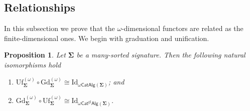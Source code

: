 \documentclass[a4paper, reqno
]{amsart}
\newcommand{\sig}[1]{\mathbf{#1}}             %
\newcommand{\Id}{\mathrm{Id}}
\newcommand{\gl}{\mathrm{gl}}                %
\newcommand{\Gd}{\mathrm{Gd}}
\newcommand{\Uf}{\mathrm{Uf}}
\theoremstyle{plain}
\newtheorem{proposition}[theorem]{Proposition}
\theoremstyle{definition}
\begin{document}
\subsection{Relationships}\label{SRelOmega}

In this subsection we prove that the $\omega$-dimensional functors are related as the finite-dimensional ones.
We begin with graduation and unification.

\begin{proposition}\label{POmegaGdUf}
Let $\sig{\Sigma}$ be a many-sorted signature.
Then the following natural isomorphisms hold
\begin{enumerate}
	\item
	$\Uf^{(\omega)}_{\sig{\Sigma}}\circ\Gd^{(\omega)}_{\sig{\Sigma}}\cong\Id_{\omega\mathsf{CatAlg}(\sig{\Sigma})}$; and

	\item
	$\Gd^{(\omega)}_{\sig{\Sigma}}\circ\Uf^{(\omega)}_{\sig{\Sigma}}\cong\Id_{\omega\mathsf{Cat}^{\gl}\mathsf{Alg}(\sig{\Sigma})}$.
\end{enumerate}
\end{proposition}
\end{document}
